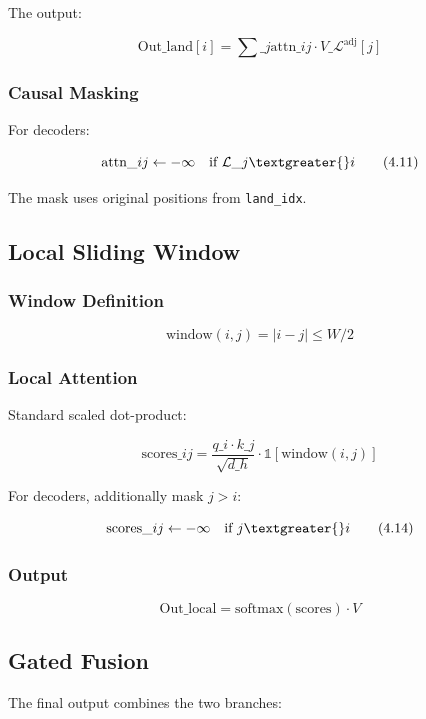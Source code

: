 The output:

\[
\text{Out}\_\text{land}[i] = \sum\_j \text{attn}\_{ij} \cdot V\_\mathcal{L}^\text{adj}[j]
\tag{4.10}
\]

\subsubsection{Causal Masking}

For decoders:

\[
\text{attn}\_{ij} \leftarrow -\infty \quad \text{if } \mathcal{L}\_j \textgreater{} i
\tag{4.11}
\]

The mask uses original positions from \texttt{land\_idx}.

\subsection{Local Sliding Window}

\subsubsection{Window Definition}

\[
\text{window}(i, j) = |i - j| \leq W/2
\tag{4.12}
\]

\subsubsection{Local Attention}

Standard scaled dot-product:

\[
\text{scores}\_{ij} = \frac{q\_i \cdot k\_j}{\sqrt{d\_h}} \cdot \mathbb{1}[\text{window}(i,j)]
\tag{4.13}
\]

For decoders, additionally mask $j > i$:

\[
\text{scores}\_{ij} \leftarrow -\infty \quad \text{if } j \textgreater{} i
\tag{4.14}
\]

\subsubsection{Output}

\[
\text{Out}\_\text{local} = \text{softmax}(\text{scores}) \cdot V
\tag{4.15}
\]

\subsection{Gated Fusion}

The final output combines the two branches:

